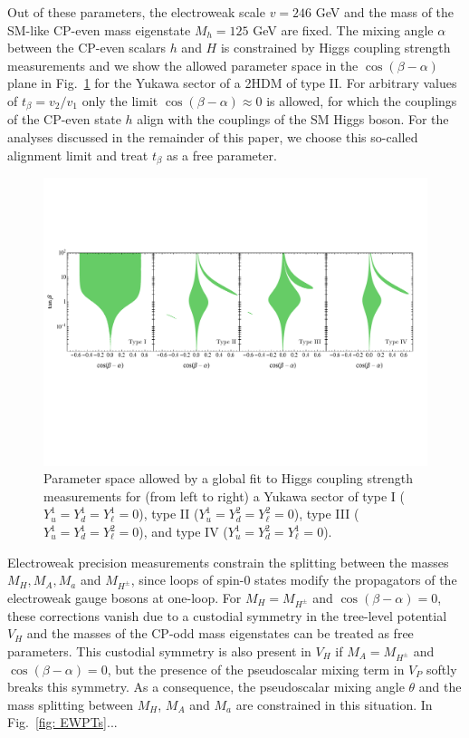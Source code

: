 Out of these parameters, the electroweak scale $v=246$ GeV and the mass of the SM-like CP-even mass eigenstate $M_h=125$ GeV are fixed. The mixing angle $\alpha$ between the CP-even scalars $h$ and $H$ is constrained by Higgs coupling strength measurements \cite{} and we show the allowed parameter space in the $\cos(\beta-\alpha)$ plane in  Fig.~\ref{fig:higgsfit} for the Yukawa sector of a 2HDM of type II.  For arbitrary values of $t_\beta=v_2/v_1$ only the limit $\cos(\beta-\alpha)\approx 0$ is allowed, for which the couplings of the CP-even state $h$ align with the couplings of the SM Higgs boson. For the analyses discussed in the remainder of this paper, we choose this so-called alignment limit and treat $t_\beta$ as a free parameter.
\begin{figure}[t]
\includegraphics[width=\textwidth]{Figs/Higgsfit}
\caption{\label{fig:higgsfit} Parameter space allowed by a global fit to Higgs coupling strength measurements for (from left to right) a Yukawa sector of type I ($Y_u^1  = Y_d^1 = Y_\ell^1 =0$), type II ($Y_u^1 = Y_d^2 = Y_\ell^2 =0$),  type III ($Y_u^1 = Y_d^1 = Y_\ell^2 =0$), and type IV ($Y_u^1  = Y_d^2 = Y_\ell^1 =0$). }
\end{figure}
Electroweak precision measurements constrain the splitting between the masses $M_H, M_A, M_a$ and $M_{H^\pm}$, since loops of spin-0 states modify the propagators of the electroweak gauge bosons at one-loop. For $M_H=M_{H^\pm}$ and $\cos(\beta-\alpha)=0$, these corrections vanish due to a custodial symmetry in the tree-level potential $V_H$ \cite{} and the masses of the CP-odd mass eigenstates can be treated as free parameters. This custodial symmetry is also present in $V_H$ if $M_A=M_{H^\pm}$ and $\cos(\beta-\alpha)=0$, but the presence of the pseudoscalar mixing term in $V_P$ softly breaks this symmetry. As a consequence, the pseudoscalar mixing angle $\theta$ and the mass splitting between $M_H$, $M_A$ and $M_a$ are constrained in this situation. In Fig.~\ref{fig: EWPTs}...
